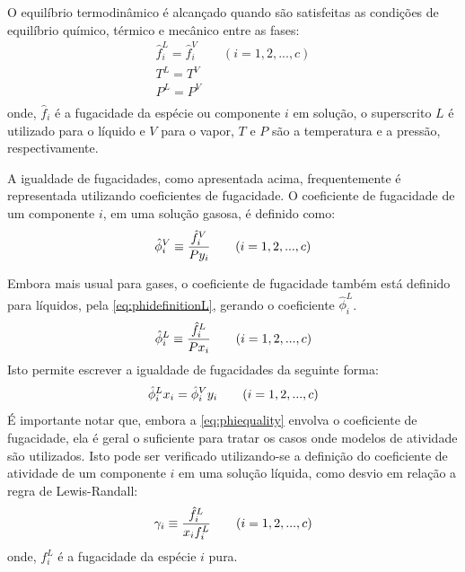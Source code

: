 
O equilíbrio termodinâmico é alcançado quando são satisfeitas as condições de equilíbrio químico, térmico e
mecânico entre as fases:
\begin{equation}
\begin{array}{c}
\hat{f}^L_i = \hat{f}^V_i \qquad (i = 1,2,...,c) \\
T^L = T^V \\
P^L = P^V \\
\end{array}
\end{equation}
onde, $\hat{f}_i$ é a fugacidade da espécie ou componente $i$ em solução, o superscrito
$L$ é utilizado para o líquido e $V$ para o vapor, $T$ e $P$ são a temperatura
e a pressão, respectivamente.


A igualdade de fugacidades, como apresentada acima, frequentemente é
representada utilizando coeficientes de fugacidade.
O coeficiente de fugacidade de um componente $i$, em uma solução gasosa, é
definido como:
\begin{equation}
\hat{\phi}^V_i \equiv \dfrac{\hat{f}^V_i}{Py_i} \qquad (i = 1,2,...,c) \\
\label{eq:phidefinition}
\end{equation}


Embora mais usual para gases, o coeficiente de fugacidade também
está definido para líquidos, pela \autoref{eq:phidefinitionL}, gerando o coeficiente $\hat{\phi}^L_i$.
\begin{equation}
\hat{\phi}^L_i \equiv \dfrac{\hat{f}^L_i}{Px_i} \qquad (i = 1,2,...,c) \\
\label{eq:phidefinitionL}
\end{equation}
Isto permite escrever a igualdade de fugacidades da seguinte forma:
\begin{equation}
\hat{\phi}^L_i x_i = \hat{\phi}^V_i y_i \qquad (i = 1,2,...,c) \\
\label{eq:phiequality}
\end{equation}
É importante notar que, embora a \autoref{eq:phiequality} envolva o
coeficiente de fugacidade, ela é geral o suficiente para tratar os casos onde
modelos de atividade são utilizados.
Isto pode ser verificado utilizando-se a definição do coeficiente de atividade
de um componente $i$ em uma solução líquida, como desvio em relação a regra de Lewis-Randall:
\begin{equation}
\gamma_i \equiv \dfrac{\hat{f}^L_i}{x_if^L_i} \qquad (i = 1,2,...,c) \\
\label{eq:gammadefinition}
\end{equation}
onde, $f^L_i$ é a fugacidade da espécie $i$ pura.

